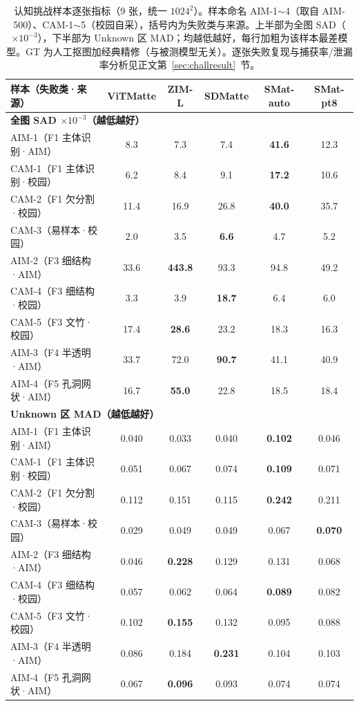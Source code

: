\begin{table}[ht]
	\centering
	\caption{认知挑战样本逐张指标（9 张，统一 $1024^2$）。样本命名 AIM-1$\sim$4（取自 AIM-500）、CAM-1$\sim$5（校园自采），括号内为失败类与来源。上半部为全图 SAD（$\times10^{-3}$），下半部为 Unknown 区 MAD；均越低越好，每行加粗为该样本最差模型。GT 为人工抠图加经典精修（与被测模型无关）。逐张失败复现与捕获率/泄漏率分析见正文第~\ref{sec:challresult}~节。}
	\label{tab:challenge}
	\small
	\begin{tabular}{lccccc}
		\toprule
		样本（失败类·来源） & ViTMatte & ZIM-L & SDMatte & SMat-auto & SMat-pt8 \\
		\midrule
		\multicolumn{6}{l}{\textbf{全图 SAD $\times10^{-3}$（越低越好）}} \\
		AIM-1（F1 主体识别·AIM） & 8.3 & 7.3 & 7.4 & \textbf{41.6} & 12.3 \\
		CAM-1（F1 主体识别·校园） & 6.2 & 8.4 & 9.1 & \textbf{17.2} & 10.6 \\
		CAM-2（F1 欠分割·校园） & 11.4 & 16.9 & 26.8 & \textbf{40.0} & 35.7 \\
		CAM-3（易样本·校园） & 2.0 & 3.5 & \textbf{6.6} & 4.7 & 5.2 \\
		AIM-2（F3 细结构·AIM） & 33.6 & \textbf{443.8} & 93.3 & 94.8 & 49.2 \\
		CAM-4（F3 细结构·校园） & 3.3 & 3.9 & \textbf{18.7} & 6.4 & 6.0 \\
		CAM-5（F3 文竹·校园） & 17.4 & \textbf{28.6} & 23.2 & 18.3 & 16.3 \\
		AIM-3（F4 半透明·AIM） & 33.7 & 72.0 & \textbf{90.7} & 41.1 & 40.9 \\
		AIM-4（F5 孔洞网状·AIM） & 16.7 & \textbf{55.0} & 22.8 & 18.5 & 18.4 \\
		\midrule
		\multicolumn{6}{l}{\textbf{Unknown 区 MAD（越低越好）}} \\
		AIM-1（F1 主体识别·AIM） & 0.040 & 0.033 & 0.040 & \textbf{0.102} & 0.046 \\
		CAM-1（F1 主体识别·校园） & 0.051 & 0.067 & 0.074 & \textbf{0.109} & 0.071 \\
		CAM-2（F1 欠分割·校园） & 0.112 & 0.151 & 0.115 & \textbf{0.242} & 0.211 \\
		CAM-3（易样本·校园） & 0.029 & 0.049 & 0.049 & 0.067 & \textbf{0.070} \\
		AIM-2（F3 细结构·AIM） & 0.046 & \textbf{0.228} & 0.129 & 0.131 & 0.068 \\
		CAM-4（F3 细结构·校园） & 0.057 & 0.062 & 0.064 & \textbf{0.089} & 0.082 \\
		CAM-5（F3 文竹·校园） & 0.102 & \textbf{0.155} & 0.132 & 0.095 & 0.088 \\
		AIM-3（F4 半透明·AIM） & 0.086 & 0.184 & \textbf{0.231} & 0.104 & 0.103 \\
		AIM-4（F5 孔洞网状·AIM） & 0.067 & \textbf{0.096} & 0.093 & 0.074 & 0.074 \\
		\bottomrule
	\end{tabular}
\end{table}
